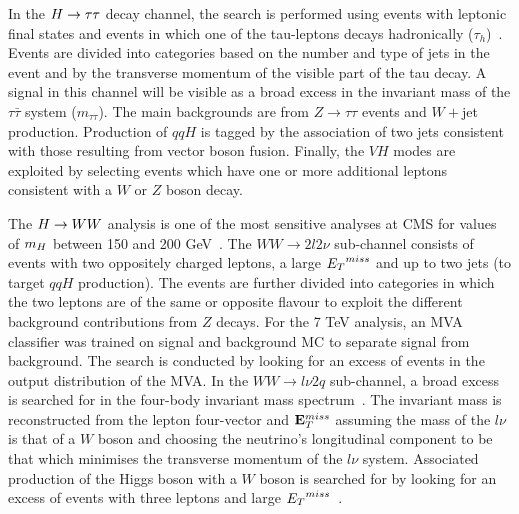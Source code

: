 In the $H\rightarrow\tau\tau$ decay channel, the search is performed using events with leptonic
final states and events in which one of the tau-leptons decays hadronically 
($\tau_{h}$)~\citep{HIG-12-018}.
Events are divided into categories based on the number and type of jets in the event
and by the transverse momentum of the visible part of the tau decay.
A signal in this channel will be visible as a broad excess in the invariant mass
of the $\tau\bar{\tau}$ system ($m_{\tau\tau}$). The main backgrounds are from
$Z\rightarrow\tau\tau$ events and $W+$jet production. 
Production of $qqH$ is tagged by the association of two jets consistent with 
those resulting from vector boson fusion. Finally, the $VH$ modes are
exploited by selecting events which have one or more additional leptons 
consistent with a $W$ or $Z$ boson decay.

The $H\rightarrow WW$ analysis is one of the most sensitive analyses at CMS for
values of $m_{H}$ between 150 and 200 GeV~\citep{HIG-12-017}. 
The $WW\rightarrow2l2\nu$ sub-channel consists of events with 
two oppositely charged leptons, a large ${E_{T}}^{miss}$ and up 
to two jets (to target $qqH$ production).
The events are further divided into categories in which the two leptons
are of the same or opposite flavour to exploit the different
background contributions from $Z$ decays. For the 7 TeV analysis,
an MVA classifier was trained on signal and background 
MC to separate signal from background. The search is conducted by looking 
for an excess of events in the output distribution of the MVA.
In the $WW\rightarrow l\nu 2q$ sub-channel, a broad excess is searched
for in the four-body invariant mass spectrum~\citep{HIG-12-021}. 
The invariant mass is reconstructed from the lepton four-vector and ${\mathbf{E}^{miss}_{T}}$ 
assuming the mass of the $l\nu$ is that of a $W$ boson and 
choosing the neutrino's longitudinal component to be that which minimises 
the transverse momentum of the $l\nu$ system.
Associated production of the Higgs boson with a $W$ boson is searched for 
by looking for an excess of events with three leptons and large 
${E_{T}}^{miss}$~\citep{HIG-11-034}.

